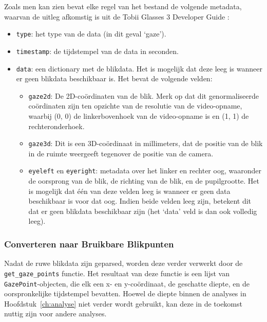 Zoals men kan zien bevat elke regel van het bestand de volgende metadata, waarvan de uitleg afkomstig is uit de Tobii Glasses 3 Developer Guide \autocite{Tobii2023}:
\begin{itemize}
    \item \texttt{type}: het type van de data (in dit geval `gaze').
    \item \texttt{timestamp}: de tijdstempel van de data in seconden.
    \item \texttt{data}: een dictionary met de blikdata. Het is mogelijk dat deze leeg is wanneer er geen blikdata beschikbaar is. Het bevat de volgende velden:
    \begin{itemize}
      \item \texttt{gaze2d}: De 2D-coördinaten van de blik. Merk op dat dit genormaliseerde coördinaten zijn ten opzichte van de resolutie van de video-opname,
      waarbij (0, 0) de linkerbovenhoek van de video-opname is en (1, 1) de rechteronderhoek.
      \item \texttt{gaze3d}: Dit is een 3D-coördinaat in millimeters, dat de positie van de blik in de ruimte weergeeft tegenover de positie van de camera.
      \item \texttt{eyeleft} en \texttt{eyeright}: metadata over het linker en rechter oog, waaronder de oorsprong van de blik, de richting van de blik, en de pupilgrootte.
      Het is mogelijk dat één van deze velden leeg is wanneer er geen data beschikbaar is voor dat oog. Indien beide velden leeg zijn, betekent dit dat er geen blikdata beschikbaar zijn (het `data' veld is dan ook volledig leeg).
    \end{itemize}
\end{itemize}

\subsubsection{Converteren naar Bruikbare Blikpunten}

Nadat de ruwe blikdata zijn geparsed, worden deze verder verwerkt door de \texttt{get\_gaze\_points} functie.
Het resultaat van deze functie is een lijst van \texttt{GazePoint}-objecten, die elk een x- en y-coördinaat, 
de geschatte diepte, en de oorspronkelijke tijdstempel bevatten.
Hoewel de diepte binnen de analyses in Hoofdstuk~\ref{ch:analyse} niet verder wordt gebruikt, kan deze in de 
toekomst nuttig zijn voor andere analyses.


